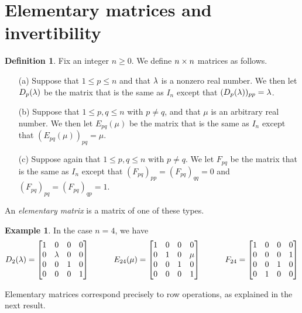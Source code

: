 \documentclass[reqno]{amsart}
\theoremstyle{definition}
\newtheorem{definition}[theorem]{Definition}
\newtheorem{example}[theorem]{Example}
\newcommand{\dfn}[1]{\emph{{#1}}\index{#1}}
\begin{document}
\section{Elementary matrices and invertibility}
\label{sec-elem}

\begin{definition}\label{defn-elementary}
 Fix an integer $n \geq 0$.  We define $n\times n$ matrices as follows.
 \begin{itemize}
  \item[(a)] Suppose that $1\leq p\leq n$ and that $\lambda$ is a nonzero
   real number.  We then let $D_p(\lambda)$ be the matrix that is the same
   as $I_n$ except that $(D_p(\lambda))_{pp}=\lambda$.
  \item[(b)] Suppose that $1\leq p,q\leq n$ with $p\neq q$, and that
   $\mu$ is an arbitrary real number.  We then let $E_{pq}(\mu)$ be
   the matrix that is the same as $I_n$ except that
   $(E_{pq}(\mu))_{pq}=\mu$.
  \item[(c)] Suppose again that $1\leq p,q\leq n$ with $p\neq q$.  We
   let $F_{pq}$ be the matrix that is the same as $I_n$ except that
   $(F_{pq})_{pp}=(F_{pq})_{qq}=0$ and $(F_{pq})_{pq}=(F_{pq})_{qp}=1$.
 \end{itemize}
 An \dfn{elementary matrix} is a matrix of one of these types.
\end{definition}

\begin{example}\label{eg-elementary}
 In the case $n=4$, we have
 \[
   D_2(\lambda) =
    \left[\begin{matrix}
     1 & 0 & 0 & 0 \\
     0 & \lambda & 0 & 0 \\
     0 & 0 & 1 & 0 \\
     0 & 0 & 0 & 1
    \end{matrix}\right]
   \hspace{3em}
   E_{24}(\mu) =
    \left[\begin{matrix}
     1 & 0 & 0 & 0 \\
     0 & 1 & 0 & \mu \\
     0 & 0 & 1 & 0 \\
     0 & 0 & 0 & 1
    \end{matrix}\right]
   \hspace{3em}
   F_{24} =
    \left[\begin{matrix}
     1 & 0 & 0 & 0 \\
     0 & 0 & 0 & 1 \\
     0 & 0 & 1 & 0 \\
     0 & 1 & 0 & 0
    \end{matrix}\right]
 \]
\end{example}

Elementary matrices correspond precisely to row operations, as
explained in the next result.
\end{document}
